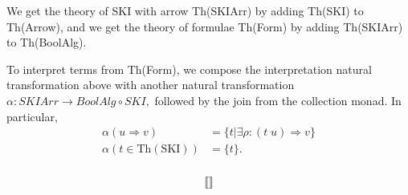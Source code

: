 \documentclass{article}
\newcommand{\interp}[1]{\llbracket #1 \rrbracket}
\newcommand{\maps}{\colon}
\newcommand{\lhom}{\Rightarrow}
\begin{document}
We get the theory of SKI with arrow Th(SKIArr) by adding Th(SKI) to Th(Arrow), and we get the theory of formulae Th(Form) by adding Th(SKIArr) to Th(BoolAlg).

To interpret terms from Th(Form), we compose the interpretation natural transformation above with another natural transformation $\alpha\maps SKIArr \to BoolAlg \circ SKI,$ followed by the join from the collection monad.  In particular, 
\begin{align*}
  \alpha(u \lhom v) &= \{ t | \exists \rho\maps (t\; u) \Rightarrow v \}\\
  \alpha(t \in \mathrm{Th(SKI)}) &= \{ t \}.\\
\end{align*}

\begin{align*}
  \interp{}
\end{align*}
\end{document}
